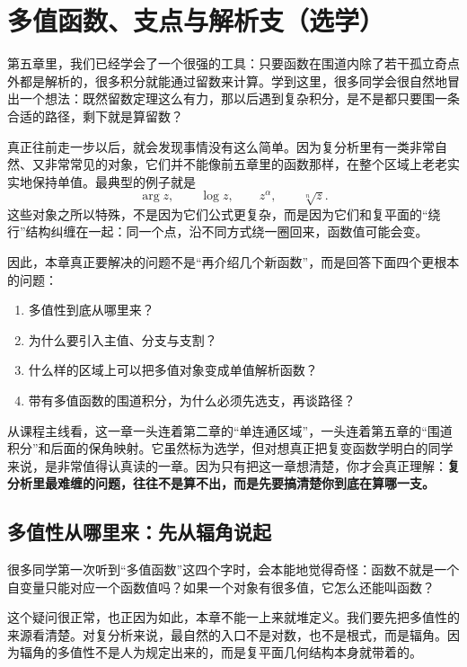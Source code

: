 
\chapter{多值函数、支点与解析支（选学）}

\begin{wulibj}[本章导读]
第五章里，我们已经学会了一个很强的工具：只要函数在围道内除了若干孤立奇点外都是解析的，很多积分就能通过留数来计算。学到这里，很多同学会很自然地冒出一个想法：既然留数定理这么有力，那以后遇到复杂积分，是不是都只要围一条合适的路径，剩下就是算留数？

真正往前走一步以后，就会发现事情没有这么简单。因为复分析里有一类非常自然、又非常常见的对象，它们并不能像前五章里的函数那样，在整个区域上老老实实地保持单值。最典型的例子就是
\[
    \arg z,\qquad \log z,\qquad z^\alpha,\qquad \sqrt[n]{z}.
\]
这些对象之所以特殊，不是因为它们公式更复杂，而是因为它们和复平面的``绕行''结构纠缠在一起：同一个点，沿不同方式绕一圈回来，函数值可能会变。

因此，本章真正要解决的问题不是``再介绍几个新函数''，而是回答下面四个更根本的问题：
\begin{enumerate}
    \item 多值性到底从哪里来？
    \item 为什么要引入主值、分支与支割？
    \item 什么样的区域上可以把多值对象变成单值解析函数？
    \item 带有多值函数的围道积分，为什么必须先选支，再谈路径？
\end{enumerate}

从课程主线看，这一章一头连着第二章的``单连通区域''，一头连着第五章的``围道积分''和后面的保角映射。它虽然标为选学，但对想真正把复变函数学明白的同学来说，是非常值得认真读的一章。因为只有把这一章想清楚，你才会真正理解：\textbf{复分析里最难缠的问题，往往不是算不出，而是先要搞清楚你到底在算哪一支。}
\end{wulibj}

\section{多值性从哪里来：先从辐角说起}

\begin{wulibj}[为什么本章先讲辐角]
很多同学第一次听到``多值函数''这四个字时，会本能地觉得奇怪：函数不就是一个自变量只能对应一个函数值吗？如果一个对象有很多值，它怎么还能叫函数？

这个疑问很正常，也正因为如此，本章不能一上来就堆定义。我们要先把多值性的来源看清楚。对复分析来说，最自然的入口不是对数，也不是根式，而是辐角。因为辐角的多值性不是人为规定出来的，而是复平面几何结构本身就带着的。
\end{wulibj}


